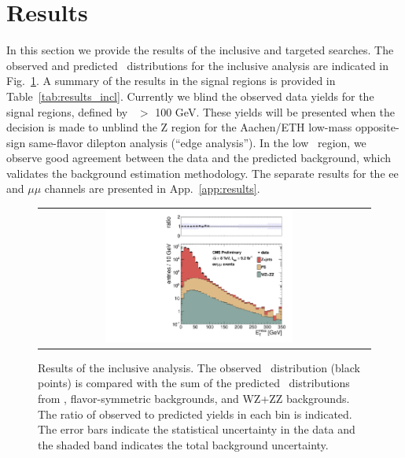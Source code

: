 \clearpage

\section{Results}

In this section we provide the results of the inclusive and targeted searches. The observed and predicted \MET\ distributions for the
inclusive analysis are indicated in Fig.~\ref{fig:results_incl}. A summary of the results in the signal regions is provided in
Table~\ref{tab:results_incl}. Currently we blind the observed data yields for the signal regions, defined by \MET\ $>$ 100 GeV.
These yields will be presented when the decision is made to unblind the Z region for the Aachen/ETH low-mass opposite-sign same-flavor
dilepton analysis (``edge analysis''). In the low \MET\ region, we observe good agreement between the data and the predicted background,
which validates the background estimation methodology.
The separate results for the ee and $\mu\mu$ channels are presented in App.~\ref{app:results}.

\begin{figure}[!h]
\begin{center}
\begin{tabular}{cc}
\includegraphics[width=0.6\textwidth]{plots/pfmet_all_92fb.pdf}
\end{tabular}
\caption{Results of the inclusive analysis. The observed \MET\ distribution (black points) is compared with the sum of the predicted \MET\
distributions from \zjets, flavor-symmetric backgrounds, and WZ+ZZ backgrounds. The ratio of observed to predicted yields in each bin is
indicated. The error bars indicate the statistical uncertainty in the data and the shaded band indicates the total background uncertainty.
\label{fig:results_incl}
}
\end{center}
\end{figure}



